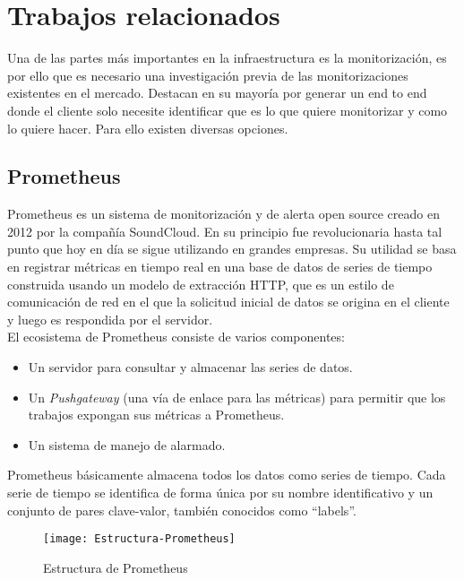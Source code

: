 \documentclass[ spanish, a4paper, 12pt, oneside]{report}
\begin{document}
\section{Trabajos relacionados}

Una de las partes más importantes en la infraestructura es la monitorización, es por ello que es necesario una investigación previa de las monitorizaciones existentes en el mercado. Destacan en su mayoría por generar un end to end donde el cliente solo necesite 
identificar que es lo que quiere monitorizar y como lo quiere hacer. Para ello existen diversas opciones.

\subsection{Prometheus}

Prometheus es un sistema de monitorización y de alerta open source creado en 2012 por la compañía SoundCloud. En su principio fue revolucionaria hasta tal punto que hoy en día se sigue utilizando en grandes empresas. Su utilidad se basa en registrar métricas en tiempo 
real en una base de datos de series de tiempo construida usando un modelo de extracción HTTP, que es un estilo de comunicación de red en el que la solicitud inicial de datos se origina en el cliente y luego es respondida por el servidor. \\

El ecosistema de Prometheus consiste de varios componentes:

\begin{itemize}
   \item Un servidor para consultar y almacenar las series de datos.
   \item Un \textit{Pushgateway} (una vía de enlace para las métricas) para permitir que los trabajos expongan sus métricas a Prometheus.
   \item Un sistema de manejo de alarmado. 
\end{itemize}

Prometheus básicamente almacena todos los datos como series de tiempo. Cada serie de tiempo se identifica de forma única por su nombre identificativo y un conjunto de pares clave-valor, también conocidos como ``labels''. \\

\begin{figure}[!h]
   \centering
   \texttt{[image: Estructura-Prometheus]}\\
      \caption{\label{fig: Estructura de Prometheus} Estructura de Prometheus}
\end{figure}
\end{document}
